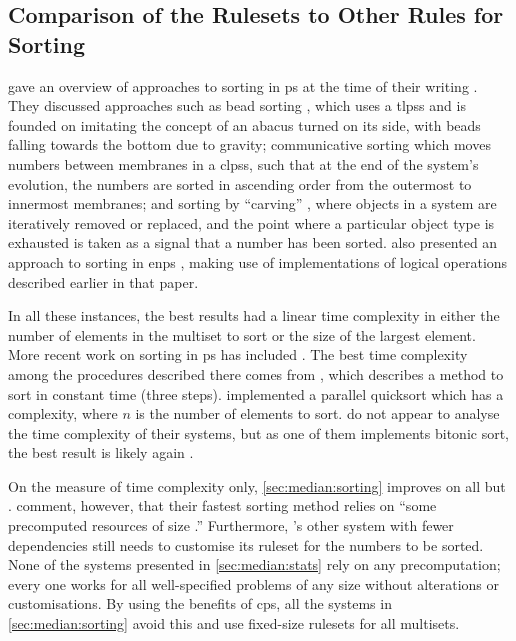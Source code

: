 \subsection{Comparison of the  Rulesets to Other  Rules for Sorting}

\citeauthor{Ceterchi2010} gave an overview of approaches to sorting in \gls{ps} at the time of their writing \cite{Ceterchi2010}.  They discussed approaches such as bead sorting \cite{Arulanandham2002}, which uses a \glspl{tlps} and is founded on imitating the concept of an abacus turned on its side, with beads falling towards the bottom due to gravity; communicative sorting \cite[Sec. 5.2]{Alhazov2007} which moves numbers between membranes in a \glspl{clps}, such that at the end of the system's evolution, the numbers are sorted in ascending order from the outermost to innermost membranes; and sorting by ``carving'' \cite{Alhazov2007}, where objects in a system are iteratively removed or replaced, and the point where a particular object type is exhausted is taken as a signal that a number has been sorted.  \citeauthor{Maeda2014} also presented an approach to sorting in \gls{enps} \cite{Maeda2014}, making use of implementations of logical operations described earlier in that paper.

In all these instances, the best results had a linear time complexity in either the number of elements in the multiset to sort or the size of the largest element.  More recent work on sorting in \gls{ps} has included \cite{Gheorghe2017,Metta2015,Yan2019}.  The best time complexity among the procedures described there comes from \cite[Sec. 3.3]{Gheorghe2017}, which describes a method to sort in constant time (three steps).  \citeauthor{Yan2019} \cite{Yan2019} implemented a parallel quicksort which has a  complexity, where \(n\) is the number of elements to sort.  \citeauthor{Metta2015} \cite{Metta2015} do not appear to analyse the time complexity of their systems, but as one of them implements bitonic sort, the best result is likely again .

On the measure of time complexity only, \cref{sec:median:sorting} improves on all but \cite{Gheorghe2017}.  \citeauthor{Gheorghe2017} comment, however, that their fastest sorting method relies on ``some precomputed resources of size .''  Furthermore, \cite{Gheorghe2017}'s other system with fewer dependencies still needs to customise its \gls{ruleset} for the numbers to be sorted.  None of the systems presented in \cref{sec:median:stats} rely on any precomputation; every one works for all well-specified problems of any size without alterations or customisations.  By using the benefits of \gls{cps}, all the systems in \cref{sec:median:sorting} avoid this and use fixed-size \glspl{ruleset} for all multisets.

